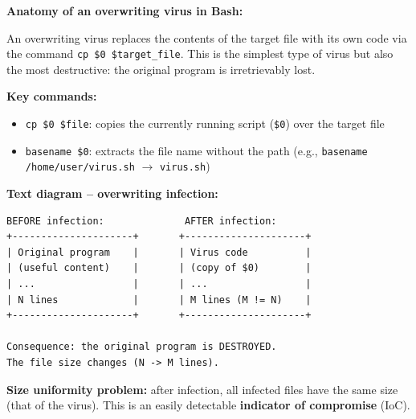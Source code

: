\documentclass[a4paper,11pt]{article}
\theoremstyle{plain}
\theoremstyle{definition}
\begin{document}
\begin{rappel}
\textbf{Anatomy of an overwriting virus in Bash:}

An overwriting virus replaces the contents of the target file with its own code via the command \texttt{cp \$0 \$target\_file}. This is the simplest type of virus but also the most destructive: the original program is irretrievably lost.

\medskip
\textbf{Key commands:}
\begin{itemize}
    \item \texttt{cp \$0 \$file}: copies the currently running script (\texttt{\$0}) over the target file
    \item \texttt{basename \$0}: extracts the file name without the path (e.g., \texttt{basename /home/user/virus.sh} $\rightarrow$ \texttt{virus.sh})
\end{itemize}

\medskip
\textbf{Text diagram -- overwriting infection:}

\begin{lstlisting}[numbers=none,frame=none,backgroundcolor=\color{white},language={}]
BEFORE infection:              AFTER infection:
+---------------------+       +---------------------+
| Original program    |       | Virus code          |
| (useful content)    |       | (copy of $0)        |
| ...                 |       | ...                 |
| N lines             |       | M lines (M != N)    |
+---------------------+       +---------------------+

Consequence: the original program is DESTROYED.
The file size changes (N -> M lines).
\end{lstlisting}

\medskip
\textbf{Size uniformity problem:} after infection, all infected files have the same size (that of the virus). This is an easily detectable \textbf{indicator of compromise} (IoC).
\end{rappel}
\end{document}
